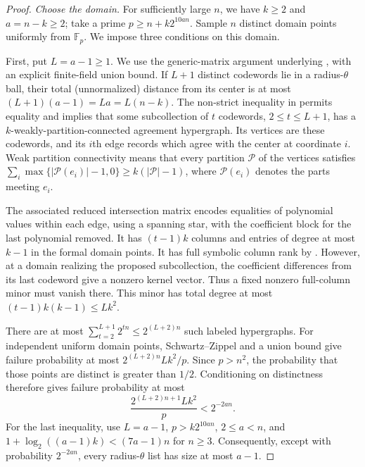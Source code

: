 \documentclass[11pt,letterpaper]{article}
\theoremstyle{definition}
\theoremstyle{remark}
\newcommand{\F}{\mathbb F}
\begin{document}
\begin{proof}
\emph{Choose the domain.}
For sufficiently large $n$, we have $k\ge2$ and $a=n-k\ge2$; take a prime $p\ge n+k2^{10an}$. Sample $n$ distinct domain points
uniformly from $\F_p$. We impose three conditions on this domain.

First, put $L=a-1\ge1$. We use the generic-matrix argument underlying
\cite[Sections 2.2--2.4 and 3.1]{aggllz}, with an explicit finite-field
union bound. If $L+1$ distinct codewords lie in a radius-$\theta$ ball,
their total (unnormalized) distance from its center is at most
$(L+1)(a-1)=La=L(n-k)$. The non-strict inequality in \cite[Lemma 2.3]{aggllz}
permits equality and implies that some
subcollection of $t$ codewords, $2\le t\le L+1$, has a
$k$-weakly-partition-connected agreement hypergraph. Its vertices are
these codewords, and its $i$th edge records which agree with the center
at coordinate $i$. Weak partition connectivity means that every partition
$\mathcal P$ of the vertices satisfies
$\sum_i\max\{|\mathcal P(e_i)|-1,0\}\ge k(|\mathcal P|-1)$,
where $\mathcal P(e_i)$ denotes the parts meeting $e_i$.

The associated reduced intersection matrix encodes equalities of
polynomial values within each edge, using a spanning star, with the
coefficient block for the last polynomial removed. It has $(t-1)k$
columns and entries of degree at most $k-1$ in the formal domain points.
It has full symbolic column rank by \cite[Theorem 2.11]{aggllz}.
However, at a domain realizing the proposed subcollection, the
coefficient differences from its last codeword give a nonzero kernel
vector. Thus a fixed nonzero full-column minor must vanish there.
This minor has total degree at most
$(t-1)k(k-1)\le Lk^2$.

There are at most
$\sum_{t=2}^{L+1}2^{tn}\le2^{(L+2)n}$ such labeled hypergraphs.
For independent uniform domain points, Schwartz--Zippel and a union
bound give failure probability at most $2^{(L+2)n}Lk^2/p$.
Since $p>n^2$, the probability that those points are distinct is greater
than $1/2$. Conditioning on distinctness therefore gives failure
probability at most
\[
 \frac{2^{(L+2)n+1}Lk^2}{p}<2^{-2an}.
\]
For the last inequality, use $L=a-1$, $p>k2^{10an}$,
$2\le a<n$, and
$1+\log_2((a-1)k)<(7a-1)n$ for $n\ge3$.
Consequently, except with probability $2^{-2an}$, every
radius-$\theta$ list has size at most $a-1$.


\end{proof}
\end{document}
